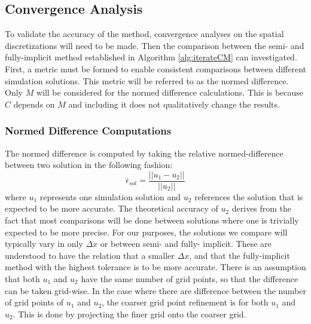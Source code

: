 
\subsection{Convergence Analysis}
To validate the accuracy of the method, convergence analyses on the spatial discretizations will need to be made. 
Then the comparison between the semi- and fully-implicit method established in Algorithm \ref{alg:iterateCM} can investigated.
First, a metric must be formed to enable consistent comparisons between different simulation solutions. 
This metric will be referred to as the normed difference. 
Only $M$ will be considered for the normed difference calculations.
This is because $C$ depends on $M$ and including it does not qualitatively change the results.

\subsubsection{Normed Difference Computations}

The normed difference is computed by taking the relative normed-difference between two solution in the following fashion:
\begin{equation} \label{equ:normed difference_comp}
  \epsilon_{sol} = \frac{||u_1 - u_2||}{||u_2||}
\end{equation}
where $u_1$ represents one simulation solution and $u_2$ references the solution that is expected to be more accurate.
The theoretical accuracy of $u_2$ derives from the fact that most comparisons will be done between solutions where one is trivially expected to be more precise.
For our purposes, the solutions we compare will typically vary in only $\Delta x$ or between semi- and fully- implicit.
These are understood to have the relation that a smaller $\Delta x$, and that the fully-implicit method with the highest tolerance is to be more accurate.
There is an assumption that both $u_1$ and $u_2$ have the same number of grid points, so that the difference can be taken grid-wise.
In the case where there are difference between the number of grid points of $u_1$ and $u_2$, the coarser grid point refinement is for both $u_1$ and $u_2$.
This is done by projecting the finer grid onto the coarser grid.


